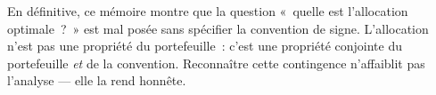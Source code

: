 \documentclass[12pt, a4paper, twoside, openright]{report}
\theoremstyle{definition}
\begin{document}
\vspace{1cm}

En définitive, ce mémoire montre que la question «~quelle est l'allocation optimale~?~» est mal posée sans spécifier la convention de signe. L'allocation n'est pas une propriété du portefeuille~: c'est une propriété conjointe du portefeuille \emph{et} de la convention. Reconnaître cette contingence n'affaiblit pas l'analyse --- elle la rend honnête.




\end{document}

